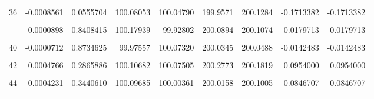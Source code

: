 \documentclass[a4paper]{tufte-handout}
\begin{document}
\begin{table}
{\begin{tabular}[t]{rrrrrrrrr}
36 & -0.0008561 & 0.0555704 & 100.08053 & 100.04790 & 199.9571 & 200.1284 & -0.1713382 & -0.1713382\\
\cellcolor{gray!6}{37} & \cellcolor{gray!6}{-0.0000164} & \cellcolor{gray!6}{0.9707969} & \cellcolor{gray!6}{100.00381} & \cellcolor{gray!6}{100.01701} & \cellcolor{gray!6}{200.0175} & \cellcolor{gray!6}{200.0208} & \cellcolor{gray!6}{-0.0032747} & \cellcolor{gray!6}{-0.0032747}\\
\addlinespace
38 & -0.0000898 & 0.8408415 & 100.17939 & 99.92802 & 200.0894 & 200.1074 & -0.0179713 & -0.0179713\\
\cellcolor{gray!6}{39} & \cellcolor{gray!6}{-0.0001503} & \cellcolor{gray!6}{0.7367628} & \cellcolor{gray!6}{100.00455} & \cellcolor{gray!6}{100.01916} & \cellcolor{gray!6}{199.9936} & \cellcolor{gray!6}{200.0237} & \cellcolor{gray!6}{-0.0300691} & \cellcolor{gray!6}{-0.0300691}\\
40 & -0.0000712 & 0.8734625 & 99.97557 & 100.07320 & 200.0345 & 200.0488 & -0.0142483 & -0.0142483\\
\cellcolor{gray!6}{41} & \cellcolor{gray!6}{0.0000246} & \cellcolor{gray!6}{0.9560569} & \cellcolor{gray!6}{100.00854} & \cellcolor{gray!6}{100.02151} & \cellcolor{gray!6}{200.0350} & \cellcolor{gray!6}{200.0300} & \cellcolor{gray!6}{0.0049292} & \cellcolor{gray!6}{0.0049292}\\
42 & 0.0004766 & 0.2865886 & 100.10682 & 100.07505 & 200.2773 & 200.1819 & 0.0954000 & 0.0954000\\
\addlinespace
\cellcolor{gray!6}{43} & \cellcolor{gray!6}{-0.0000857} & \cellcolor{gray!6}{0.8479615} & \cellcolor{gray!6}{100.00054} & \cellcolor{gray!6}{100.02174} & \cellcolor{gray!6}{200.0051} & \cellcolor{gray!6}{200.0223} & \cellcolor{gray!6}{-0.0171499} & \cellcolor{gray!6}{-0.0171499}\\
44 & -0.0004231 & 0.3440610 & 100.09685 & 100.00361 & 200.0158 & 200.1005 & -0.0846707 & -0.0846707\\
\cellcolor{gray!6}{45} & \cellcolor{gray!6}{-0.0006599} & \cellcolor{gray!6}{0.1400776} & \cellcolor{gray!6}{99.96225} & \cellcolor{gray!6}{100.01485} & \cellcolor{gray!6}{199.8451} & \cellcolor{gray!6}{199.9771} & \cellcolor{gray!6}{-0.1319578} & \cellcolor{gray!6}{-0.1319578}\\
\bottomrule
\end{tabular}}
\end{table}
\end{document}
